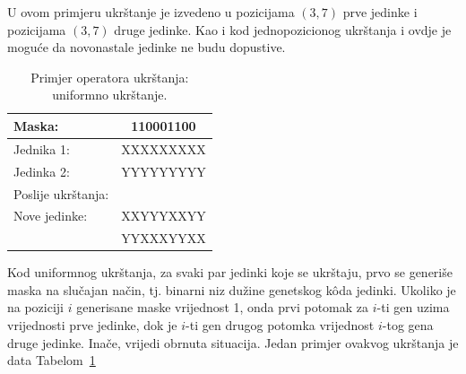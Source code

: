 \documentclass[a4paper, utf8, 11pt, colorlinks]{book}
\theoremstyle{definition}
\begin{document}
U ovom primjeru ukrštanje je izvedeno u pozicijama $(3,7)$ prve jedinke i pozicijama $(3, 7)$ druge jedinke. Kao i kod jednopozicionog ukrštanja i ovdje je moguće da novonastale jedinke ne budu dopustive. 
\begin{table}[H]
	\centering
	
	\begin{tabular}{lc}
		Maska:      &   110001100   \\\hline
		Jednika 1:  &	XXXXXXXXX   \\ 
		Jedinka 2: &	YYYYYYYYY   \\
		Poslije ukrštanja:  &       \\ \hline
		Nove jedinke:            &  XXYYYXXYY    \\
		&  YYXXXYYXX    \\
	\end{tabular}
	\caption{Primjer operatora ukrštanja: uniformno ukrštanje.}\label{tbl:uniukr}
\end{table}


Kod uniformnog ukrštanja, za svaki par jedinki koje se ukrštaju, prvo se generiše maska na slučajan način, tj. binarni niz dužine genetskog k\^oda jedinki. Ukoliko je na poziciji $i$ generisane maske vrijednost 1, onda prvi potomak za $i$-ti gen uzima vrijednosti prve jedinke, dok je $i$-ti gen drugog potomka vrijednost $i$-tog gena druge jedinke. Inače, vrijedi obrnuta situacija. Jedan primjer ovakvog ukrštanja je data Tabelom~\ref{tbl:uniukr}
\end{document}
